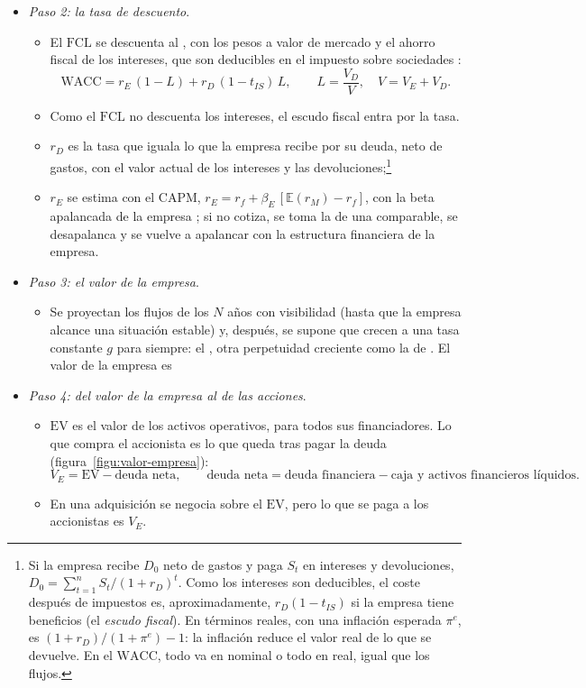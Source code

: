 \documentclass[11pt]{article}
\begin{document}
\begin{itemize}
\item \emph{Paso 2: la tasa de descuento}.
  \begin{itemize}
  \item El $\mathrm{FCL}$ se descuenta al , con los pesos a valor de mercado y el ahorro fiscal de los intereses, que son deducibles en el impuesto sobre sociedades :
  \[
  \boxed{\mathrm{WACC}=r_E\,(1-L)+r_D\,(1-t_{IS})\,L,\qquad L=\frac{V_D}{V},\quad V=V_E+V_D.}
  \]
  \item Como el $\mathrm{FCL}$ no descuenta los intereses, el escudo fiscal entra por la tasa.
  \item $r_D$ es la tasa que iguala lo que la empresa recibe por su deuda, neto de gastos, con el valor actual de los intereses y las devoluciones;\footnote{Si la empresa recibe $D_0$ neto de gastos y paga $S_t$ en intereses y devoluciones, $D_0=\sum_{t=1}^{n}S_t/(1+r_D)^t$. Como los intereses son deducibles, el coste después de impuestos es, aproximadamente, $r_D(1-t_{IS})$ si la empresa tiene beneficios (el \emph{escudo fiscal}). En términos reales, con una inflación esperada $\pi^{e}$, es $(1+r_D)/(1+\pi^{e})-1$: la inflación reduce el valor real de lo que se devuelve. En el $\mathrm{WACC}$, todo va en nominal o todo en real, igual que los flujos.}
  \item $r_E$ se estima con el CAPM, $r_E=r_f+\beta_E\,[\mathbb{E}(r_M)-r_f]$, con la beta apalancada de la empresa ; si no cotiza, se toma la de una comparable, se desapalanca y se vuelve a apalancar con la estructura financiera de la empresa.
  \end{itemize}
\item \emph{Paso 3: el valor de la empresa}.
  \begin{itemize}
  \item Se proyectan los flujos de los $N$ años con visibilidad (hasta que la empresa alcance una situación estable) y, después, se supone que crecen a una tasa constante $g$ para siempre: el , otra perpetuidad creciente como la de . El valor de la empresa es
  \end{itemize}
\item \emph{Paso 4: del valor de la empresa al de las acciones}.
  \begin{itemize}
  \item $\mathrm{EV}$ es el valor de los activos operativos, para todos sus financiadores. Lo que compra el accionista es lo que queda tras pagar la deuda (figura~\ref{figu:valor-empresa}):
  \[
  V_E=\mathrm{EV}-\text{deuda neta},\qquad \text{deuda neta}=\text{deuda financiera}-\text{caja y activos financieros líquidos}.
  \]
  \item En una adquisición se negocia sobre el $\mathrm{EV}$, pero lo que se paga a los accionistas es $V_E$.
  \end{itemize}
\end{itemize}
\end{document}
